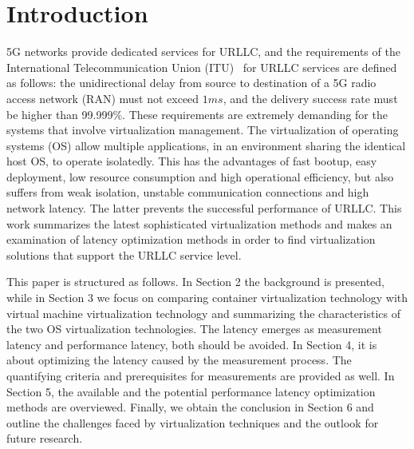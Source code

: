 \section{Introduction}
5G networks provide dedicated services for URLLC, and the requirements of the International
Telecommunication Union (ITU)~\cite{b24,b14} for URLLC services are defined as follows: the
unidirectional delay from source to destination of a 5G radio access network (RAN) must not
exceed $\si{1}{ms}$, and the delivery success rate must be higher than 99.999\%.
These requirements are extremely demanding for the systems that involve virtualization
management.
The virtualization of operating systems (OS) allow multiple applications,
in an environment sharing the identical host OS, to operate isolatedly.
This has the advantages of fast bootup, easy deployment, low resource consumption and high
operational efficiency\cite{b6}, but also suffers from weak isolation, unstable communication
connections and high network latency\cite{b15}.
The latter prevents the successful performance of URLLC.
This work summarizes the latest sophisticated virtualization methods and makes an examination
of latency optimization methods in order to find virtualization solutions that support the
URLLC service level.

This paper is structured as follows.
In Section 2 the background is presented, while in Section 3 we focus on
comparing container virtualization technology with virtual machine virtualization technology
and summarizing the characteristics of the two OS virtualization technologies.
The latency emerges as measurement latency and performance latency, both should be avoided.
In Section 4, it is about optimizing the latency caused by the measurement process.
The quantifying criteria and prerequisites for measurements are provided as well.
In Section 5, the available and the potential performance latency optimization methods
are overviewed.
Finally, we obtain the conclusion in Section 6 and outline the challenges faced by
virtualization techniques and the outlook for future research.